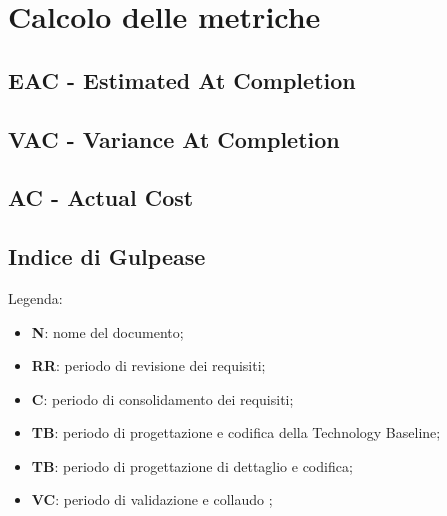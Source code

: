 \section{Calcolo delle metriche}
\subsection{EAC - Estimated At Completion}

\subsection{VAC - Variance At Completion}

\subsection{AC - Actual Cost}


\subsection{Indice di Gulpease}
Legenda:
\begin{itemize}
	\item \textbf{N}: nome del documento;
	\item \textbf{RR}: periodo di revisione dei requisiti;
	\item \textbf{C}: periodo di consolidamento dei requisiti;
	\item \textbf{TB}: periodo di progettazione e codifica della Technology Baseline;
	\item \textbf{TB}: periodo di progettazione di dettaglio e codifica;
	\item \textbf{VC}: periodo di validazione e collaudo ;
\end{itemize}

